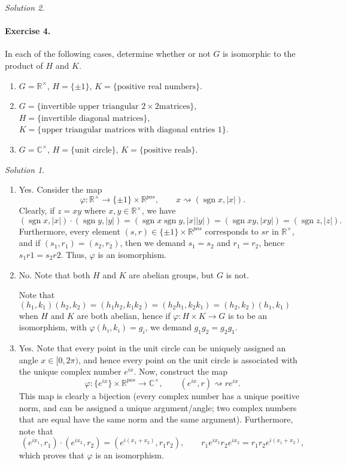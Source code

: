 \documentclass[11pt]{report}
\def\C{\mathbb{C}}
\def\R{\mathbb{R}}
\DeclareMathOperator\sgn{sgn}
\theoremstyle{remark}
\newtheorem*{solution}{Solution}
\begin{document}
\begin{solution}
    \paragraph{Exercise 4.} In each of the following cases, determine whether or not
    $G$ is isomorphic to the product of $H$ and $K$.
    \begin{enumerate}
        \itemsep0em
        \item $G = \R^\times$, $H = \{\pm 1\}$, $K = \{\text{positive real
        numbers}\}$.
        \item $G = \{\text{invertible upper triangular }2\times 2\text{
        matrices}\}$, $H = \{\text{invertible diagonal matrices}\}$, $K =
        \{\text{upper triangular matrices with diagonal entries }1\}$.
        \item $G = \C^\times$, $H = \{\text{unit circle}\}$, $K = \{\text{positive
        reals}\}$.
    \end{enumerate}
    \begin{solution} \mbox{}
    \begin{enumerate}
        \item Yes. Consider the map \[
            \varphi\colon \R^\times \to \{\pm 1\}\times \R^{pos}, \qquad
            x \rightsquigarrow (\sgn{x}, |x|).
        \] Clearly, if $z = xy$ where $x, y \in \R^\times$, we have \[
            (\sgn{x}, |x|)\cdot(\sgn{y}, |y|) = (\sgn{x}\sgn{y}, |x| |y|) =
            (\sgn{xy}, |xy|) = (\sgn{z}, |z|).
        \] Furthermore, every element $(s, r) \in \{\pm 1\}\times\R^{pos}$
        corresponds to $sr$ in $\R^\times$, and if $(s_1, r_1) = (s_2, r_2)$, then
        we demand $s_1 = s_2$ and $r_1 = r_2$, hence $s_1r1 = s_2r2$. Thus,
        $\varphi$ is an isomorphism.

        \item No. Note that both $H$ and $K$ are abelian groups, but $G$ is not.

        Note that $(h_1, k_1)(h_2, k_2) = (h_1h_2, k_1k_2) = (h_2h_1, k_2k_1) = (h_2,
        k_2)(h_1, k_1)$ when $H$ and $K$ are both abelian, hence if $\varphi\colon
        H\times K \to G$ is to be an isomorphism, with $\varphi(h_i, k_i) = g_i$, we
        demand $g_1g_2 = g_2g_1$.

        \item Yes. Note that every point in the unit circle can be uniquely assigned
        an angle $x \in [0, 2\pi)$, and hence every point on the unit circle is
        associated with the unique complex number $e^{ix}$. Now, construct the map
        \[
            \varphi\colon \{e^{ix}\}\times \R^{pos} \to \C^\times, \qquad
            (e^{ix}, r) \rightsquigarrow re^{ix}.
        \] This map is clearly a bijection (every complex number has a unique
        positive norm, and can be assigned a unique argument/angle; two complex
        numbers that are equal have the same norm and the same argument).
        Furthermore, note that \[
            (e^{ix_1}, r_1)\cdot (e^{ix_2}, r_2) = (e^{i(x_1 + x_2)}, r_1r_2), \qquad 
            r_1e^{ix_1} r_2e^{ix_2} = r_1r_2 e^{i(x_1 + x_2)},
        \] which proves that $\varphi$ is an isomorphism.
    \end{enumerate}
    \end{solution}
    

\end{solution}
\end{document}
